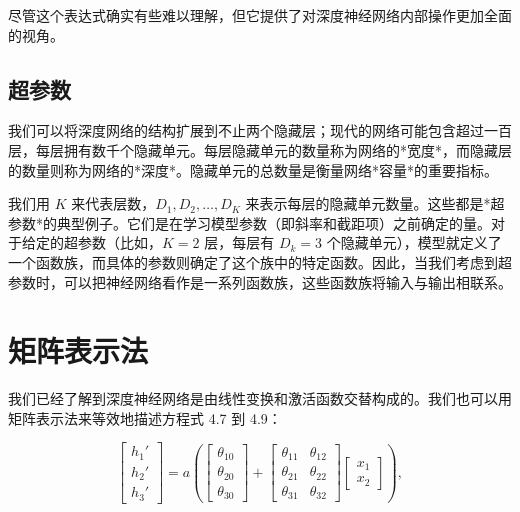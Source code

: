 \documentclass[lang=cn,newtx,10pt,scheme=chinese]{elegantbook}
\begin{document}
尽管这个表达式确实有些难以理解，但它提供了对深度神经网络内部操作更加全面的视角。

\subsection{超参数}
我们可以将深度网络的结构扩展到不止两个隐藏层；现代的网络可能包含超过一百层，每层拥有数千个隐藏单元。每层隐藏单元的数量称为网络的*宽度*，而隐藏层的数量则称为网络的*深度*。隐藏单元的总数量是衡量网络*容量*的重要指标。

我们用 \(K\) 来代表层数，\(D_1, D_2, \ldots, D_K\) 来表示每层的隐藏单元数量。这些都是*超参数*的典型例子。它们是在学习模型参数（即斜率和截距项）之前确定的量。对于给定的超参数（比如，\(K = 2\) 层，每层有 \(D_k = 3\) 个隐藏单元），模型就定义了一个函数族，而具体的参数则确定了这个族中的特定函数。因此，当我们考虑到超参数时，可以把神经网络看作是一系列函数族，这些函数族将输入与输出相联系。


\section{矩阵表示法}
我们已经了解到深度神经网络是由线性变换和激活函数交替构成的。我们也可以用矩阵表示法来等效地描述方程式 4.7 到 4.9：

\begin{equation}
\begin{bmatrix}
	h_1' \\
	h_2' \\
	h_3'
\end{bmatrix}
= a
\left(
\begin{bmatrix}
	\theta_{10} \\
	\theta_{20} \\
	\theta_{30}
\end{bmatrix}
+
\begin{bmatrix}
	\theta_{11} & \theta_{12} \\
	\theta_{21} & \theta_{22} \\
	\theta_{31} & \theta_{32}
\end{bmatrix}
\begin{bmatrix}
	x_1 \\
	x_2
\end{bmatrix}
\right),
\end{equation}
\end{document}
